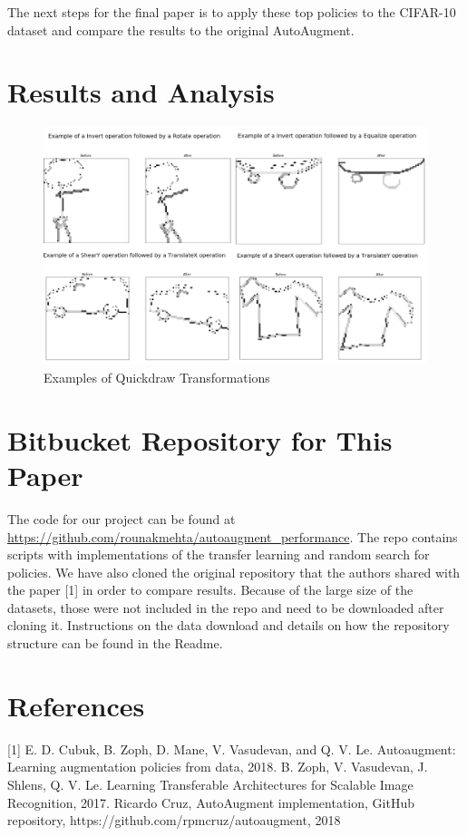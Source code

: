 \documentclass[10pt,twocolumn,letterpaper]{article}
\begin{document}
The next steps for the final paper is to apply these top policies to the CIFAR-10 dataset and compare the results to the original AutoAugment.



\section{Results and Analysis}

\begin{figure}[bhp]
\includegraphics[width=\columnwidth]{quickdraw_compiled_transform_exmples.png}
\caption{Examples of Quickdraw Transformations}
\end{figure}


\section{Bitbucket Repository for This Paper}

The code for our project can be found at \url{https://github.com/rounakmehta/autoaugment_performance}. The repo contains scripts with implementations of the transfer learning and random search for policies. We have also cloned the original repository that the authors shared with the paper [1] in order to compare results. Because of the large size of the datasets, those were not included in the repo and need to be downloaded after cloning it. Instructions on the data download and details on how the repository structure can be found in the Readme.  

\section{References}

[1]  E. D. Cubuk, B. Zoph, D. Mane, V. Vasudevan, and Q. V. Le. Autoaugment:   Learning  augmentation  policies  from  data, 2018. \newline
[2] B. Zoph, V. Vasudevan, J. Shlens, Q. V. Le. Learning Transferable Architectures for Scalable Image Recognition, 2017. \newline
[3] Ricardo Cruz, AutoAugment implementation, GitHub repository, https://github.com/rpmcruz/autoaugment, 2018 \newline

{\small


}
\end{document}
